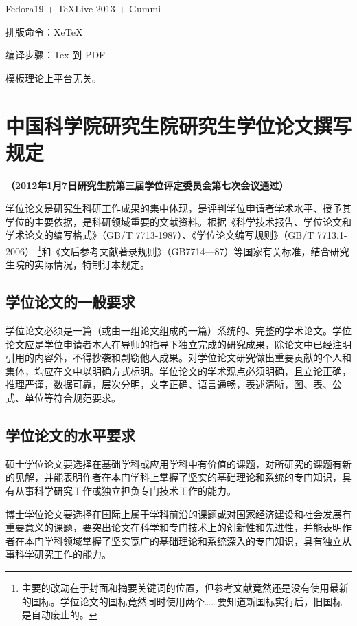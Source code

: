 \documentclass[a4paper,12pt,oneside,openany]{book}
\begin{document}
Fedora19 + \TeX Live 2013 +  Gummi

排版命令：XeTeX

编译步骤：Tex 到 PDF

模板理论上平台无关。


\chapter{中国科学院研究生院研究生学位论文撰写规定 }

\begin{center}
\textbf{（2012年1月7日研究生院第三届学位评定委员会第七次会议通过）}
\par\end{center}

学位论文是研究生科研工作成果的集中体现，是评判学位申请者学术水平、授予其学位的主要依据，是科研领域重要的文献资料。根据《科学技术报告、学位论文和学术论文的编写格式》（GB/T
7713-1987）、《学位论文编写规则》（GB/T 7713.1-2006）\textbf{}%
\footnote{主要的改动在于封面和摘要关键词的位置，但参考文献竟然还是没有使用最新的国标。学位论文的国标竟然同时使用两个……要知道新国标实行后，旧国标是自动废止的。%
}和《文后参考文献著录规则》（GB7714—87）等国家有关标准，结合研究生院的实际情况，特制订本规定。


\section{学位论文的一般要求}

学位论文必须是一篇（或由一组论文组成的一篇）系统的、完整的学术论文。学位论文应是学位申请者本人在导师的指导下独立完成的研究成果，除论文中已经注明引用的内容外，不得抄袭和剽窃他人成果。对学位论文研究做出重要贡献的个人和集体，均应在文中以明确方式标明。学位论文的学术观点必须明确，且立论正确，推理严谨，数据可靠，层次分明，文字正确、语言通畅，表述清晰，图、表、公式、单位等符合规范要求。


\section{学位论文的水平要求}

硕士学位论文要选择在基础学科或应用学科中有价值的课题，对所研究的课题有新的见解，并能表明作者在本门学科上掌握了坚实的基础理论和系统的专门知识，具有从事科学研究工作或独立担负专门技术工作的能力。

博士学位论文要选择在国际上属于学科前沿的课题或对国家经济建设和社会发展有重要意义的课题，要突出论文在科学和专门技术上的创新性和先进性，并能表明作者在本门学科领域掌握了坚实宽广的基础理论和系统深入的专门知识，具有独立从事科学研究工作的能力。
\end{document}
